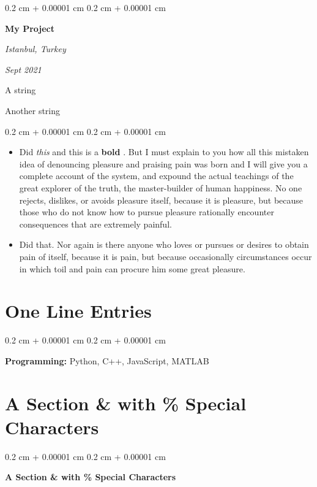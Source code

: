 \documentclass[10pt, letterpaper]{article}
\newenvironment{summary}{
    \begin{description}[
        topsep=0.10 cm,
        parsep=0.10 cm,
        partopsep=0pt,
        itemsep=0pt,
        leftmargin=0.4 cm + 10pt
    ]
}{
    \end{description}
} %
\newenvironment{highlights}{
    \begin{itemize}[
        topsep=0.10 cm,
        parsep=0.10 cm,
        partopsep=0pt,
        itemsep=0pt,
        leftmargin=0.4 cm + 10pt
    ]
}{
    \end{itemize}
} %
\newenvironment{onecolentry}{
    \begin{adjustwidth}{
        0.2 cm + 0.00001 cm
    }{
        0.2 cm + 0.00001 cm
    }
}{
    \end{adjustwidth}
} %
\newenvironment{twocolentry}[2][]{
    \onecolentry
    \def\secondColumn{#2}
    \setcolumnwidth{\fill, 4.5 cm}
    \begin{paracol}{2}
}{
    \switchcolumn \raggedleft \secondColumn
    \end{paracol}
    \endonecolentry
} %
\let\hrefWithoutArrow\href
\renewcommand{\href}[2]{\hrefWithoutArrow{#1}{\ifthenelse{\equal{#2}{}}{ }{#2 }\raisebox{.15ex}{\footnotesize \faExternalLink*}}}
\begin{document}
        \begin{twocolentry}{
        \textit{Istanbul, Turkey}    
            
        \textit{Sept 2021}}
            \textbf{My Project}
        \end{twocolentry}
            \begin{summary}
                \item A string
                \item Another string
            \end{summary}
        \vspace{0.10 cm}
        \begin{onecolentry}
            \begin{highlights}
                \item Did \textit{this} and this is a \textbf{bold} \href{https://example.com}{link}. But I must explain to you how all this mistaken idea of denouncing pleasure and praising pain was born and I will give you a complete account of the system, and expound the actual teachings of the great explorer of the truth, the master-builder of human happiness. No one rejects, dislikes, or avoids pleasure itself, because it is pleasure, but because those who do not know how to pursue pleasure rationally encounter consequences that are extremely painful.
                \item Did that. Nor again is there anyone who loves or pursues or desires to obtain pain of itself, because it is pain, but because occasionally circumstances occur in which toil and pain can procure him some great pleasure.
            \end{highlights}
        \end{onecolentry}



    
    \section{One Line Entries}



        
        \begin{onecolentry}
            \textbf{Pro\textnormal{gram}ming:} Python, C++, JavaScript, MATLAB
        \end{onecolentry}


    
    \section{A Section \& with \% Special Characters}



        
        \begin{onecolentry}
            \textbf{A Section \& with \% Special Characters}
        \end{onecolentry}



    
\end{document}
